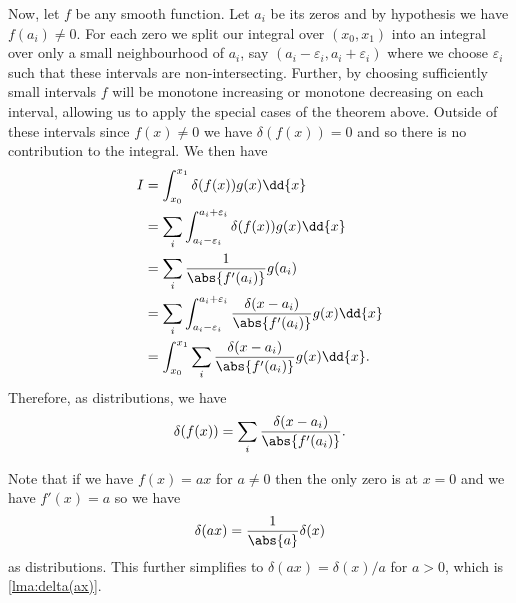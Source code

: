Now, let \(f\) be any smooth function.
Let \(a_i\) be its zeros and by hypothesis we have \(f(a_i) \ne 0\).
For each zero we split our integral over \((x_0, x_1)\) into an integral over only a small neighbourhood of \(a_i\), say \((a_i - \varepsilon_i, a_i + \varepsilon_i)\) where we choose \(\varepsilon_i\) such that these intervals are non-intersecting.
Further, by choosing sufficiently small intervals \(f\) will be monotone increasing or monotone decreasing on each interval, allowing us to apply the special cases of the theorem above.
Outside of these intervals since \(f(x) \ne 0\) we have \(\delta(f(x)) = 0\) and so there is no contribution to the integral.
We then have
\begin{align}
    I &= \int_{x_0}^{x_1} \delta(f(x)) g(x) \dd{x}\\
    &= \sum_{i} \int_{a_i - \varepsilon_i}^{a_i + \varepsilon_i} \delta(f(x)) g(x) \dd{x}\\
    &= \sum_{i} \frac{1}{\abs{f'(a_i)}} g(a_i)\\
    &= \sum_{i} \int_{a_i - \varepsilon_i}^{a_i + \varepsilon_i} \frac{\delta(x - a_i)}{\abs{f'(a_i)}} g(x) \dd{x}\\
    &= \int_{x_0}^{x_1} \sum_{i} \frac{\delta(x - a_i)}{\abs{f'(a_i)}} g(x) \dd{x}.
\end{align}
Therefore, as distributions, we have
\begin{equation}
    \delta(f(x)) = \sum_i \frac{\delta(x - a_i)}{\abs{f'(a_i)}}.
\end{equation}

Note that if we have \(f(x) = ax\) for \(a \ne 0\) then the only zero is at \(x = 0\) and we have \(f'(x) = a\) so we have
\begin{equation}
    \delta(ax) = \frac{1}{\abs{a}} \delta(x)
\end{equation}
as distributions.
This further simplifies to \(\delta(ax) = \delta(x)/a\) for \(a > 0\), which is \cref{lma:delta(ax)}.

